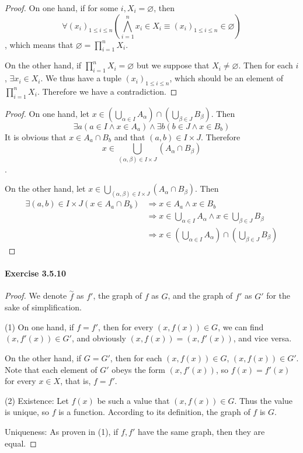 \begin{proof}
On one hand, if for some $i, X_i = \varnothing$, then 
\[
\forall (x_i)_{1\leq i \leq n}(\bigwedge^{n}_{i =1}x_i \in X_i \equiv (x_i)_{1\leq i \leq n} \in 
\varnothing)
\], 
which means that $\varnothing = \prod_{i=1}^{n}X_i$.

On the other hand, if $\prod_{i=1}^{n}X_i = \varnothing$ but we suppose that $X_i \neq \varnothing$. Then 
for each $i$, $\exists x_i \in X_i$. We thus have a tuple $(x_i)_{1\leq i \leq n}$, which should be an 
element of $\prod_{i=1}^{n}X_i$. Therefore we have a contradiction.
\end{proof}

\begin{proof}
On one hand, let $x \in (\bigcup_{\alpha \in I}A_{\alpha})\cap(\bigcup_{\beta \in J}B_{\beta})$. Then 
\[
\exists a(a \in I \wedge x \in A_a) \wedge \exists b(b \in J \wedge x \in B_b)
\]
It is obvious that $x \in A_a \cap B_b$ and that $(a,b) \in I \times J$. Therefore 
\[
x \in \bigcup_{(\alpha,\beta) \in I \times J}(A_\alpha \cap B_\beta)
\].

On the other hand, let $x \in \bigcup_{(\alpha,\beta) \in I \times J}(A_\alpha \cap B_\beta)$. Then 
\begin{align*}
\exists (a,b) \in I \times J(x \in A_a \cap B_b) 
&\Longrightarrow  x \in A_a \wedge x \in B_b \\
&\Longrightarrow x \in \bigcup_{\alpha \in I}A_{\alpha} \wedge x \in \bigcup_{\beta \in J}B_{\beta} \\
&\Longrightarrow x \in (\bigcup_{\alpha \in I}A_{\alpha})\cap(\bigcup_{\beta \in J}B_{\beta})
\end{align*}
\end{proof}

\paragraph{Exercise 3.5.10} \label{exercise3.5.10}
\begin{proof}
We denote $\overset{\sim}{f}$ as $f'$, the graph of $f$ as $G$, and the graph of $f'$ as $G'$ for the 
sake of simplification.

(1) On one hand, if $f = f'$, then for every $(x,f(x)) \in G$, we can find $(x,f'(x)) \in G'$, and 
obviously $(x,f(x)) = (x,f'(x))$, and vice versa.

On the other hand, if $G = G'$, then for each $(x,f(x)) \in G$, $(x,f(x)) \in G'$. Note that each 
element of $G'$ obeys the form $(x,f'(x))$, so $f(x) = f'(x)$ for every $x \in X$, that is, $f=f'$.

(2) Existence: Let $f(x)$ be such a value that $(x,f(x)) \in G$. Thus the value is unique, so $f$ is a 
function. According to its definition, the graph of $f$ is $G$.

Uniqueness: As proven in (1), if $f,f'$ have the same graph, then they are equal.
\end{proof}

